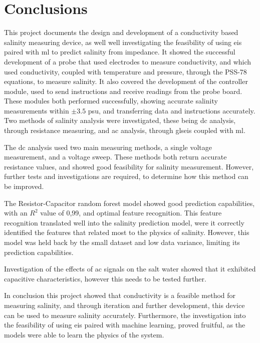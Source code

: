 \chapter{Conclusions}
This project documents the design and development of a conductivity based salinity measuring device, as well well investigating the feasibility of using \gls{eis} paired with \gls{ml} to predict salinity from impedance.
It showed the successful development of a probe that used electrodes to measure conductivity, and which used conductivity, coupled with temperature and pressure, through the PSS-78 equations, to measure salinity.
It also covered the development of the controller module, used to send instructions and receive readings from the probe board. These modules both performed successfully, showing accurate salinity measurements within $\pm3.5$ \gls{psu}, and transferring data and instructions accurately.
Two methods of salinity analysis were investigated, these being \gls{dc} analysis, through resistance measuring, and \gls{ac} analysis, through gls{eis} coupled with \gls{ml}.

The \gls{dc} analysis used two main measuring methods, a single voltage measurement, and a voltage sweep. 
These methods both return accurate resistance values, and showed good feasibility for salinity measurement.
However, further tests and investigations are required, to determine how this method can be improved.

The Resistor-Capacitor random forest model showed good prediction capabilities, with an $R^2$ value of 0,99, and optimal feature recognition. This feature recognition translated well into the salinity prediction model, were it correctly identified the features that related most to the physics of salinity.
However, this model was held back by the small dataset and low data variance, limiting its prediction capabilities.

Investigation of the effects of \gls{ac} signals on the salt water showed that it exhibited capacitive characteristics, however this needs to be tested further.

In conclusion this project showed that conductivity is a feasible method for measuring salinity, and through iteration and further development, this device can be used to measure salinity accurately.
Furthermore, the investigation into the feasibility of using \gls{eis} paired with machine learning, proved fruitful, as the models were able to learn the physics of the system.